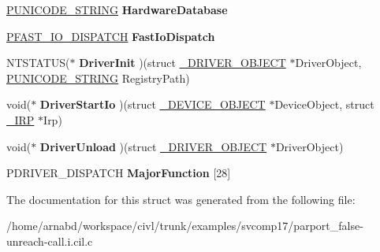 \begin{DoxyCompactItemize}
\item 
\hypertarget{struct__DRIVER__OBJECT_a112fcbcac6369066a448fd7622670535}{}\hyperlink{struct__UNICODE__STRING}{P\+U\+N\+I\+C\+O\+D\+E\+\_\+\+S\+T\+R\+I\+N\+G} {\bfseries Hardware\+Database}\label{struct__DRIVER__OBJECT_a112fcbcac6369066a448fd7622670535}

\item 
\hypertarget{struct__DRIVER__OBJECT_a76534a5c0961700f050b64f0f7a2d7a6}{}\hyperlink{struct__FAST__IO__DISPATCH}{P\+F\+A\+S\+T\+\_\+\+I\+O\+\_\+\+D\+I\+S\+P\+A\+T\+C\+H} {\bfseries Fast\+Io\+Dispatch}\label{struct__DRIVER__OBJECT_a76534a5c0961700f050b64f0f7a2d7a6}

\item 
\hypertarget{struct__DRIVER__OBJECT_a5d751b75e5bd2962d646635801953b55}{}N\+T\+S\+T\+A\+T\+U\+S($\ast$ {\bfseries Driver\+Init} )(struct \hyperlink{struct__DRIVER__OBJECT}{\+\_\+\+D\+R\+I\+V\+E\+R\+\_\+\+O\+B\+J\+E\+C\+T} $\ast$Driver\+Object, \hyperlink{struct__UNICODE__STRING}{P\+U\+N\+I\+C\+O\+D\+E\+\_\+\+S\+T\+R\+I\+N\+G} Registry\+Path)\label{struct__DRIVER__OBJECT_a5d751b75e5bd2962d646635801953b55}

\item 
\hypertarget{struct__DRIVER__OBJECT_a3953c3b3473a74a85fe2d598cb4fe2b2}{}void($\ast$ {\bfseries Driver\+Start\+Io} )(struct \hyperlink{struct__DEVICE__OBJECT}{\+\_\+\+D\+E\+V\+I\+C\+E\+\_\+\+O\+B\+J\+E\+C\+T} $\ast$Device\+Object, struct \hyperlink{struct__IRP}{\+\_\+\+I\+R\+P} $\ast$Irp)\label{struct__DRIVER__OBJECT_a3953c3b3473a74a85fe2d598cb4fe2b2}

\item 
\hypertarget{struct__DRIVER__OBJECT_aded034bd7664cf454169cb801143b979}{}void($\ast$ {\bfseries Driver\+Unload} )(struct \hyperlink{struct__DRIVER__OBJECT}{\+\_\+\+D\+R\+I\+V\+E\+R\+\_\+\+O\+B\+J\+E\+C\+T} $\ast$Driver\+Object)\label{struct__DRIVER__OBJECT_aded034bd7664cf454169cb801143b979}

\item 
\hypertarget{struct__DRIVER__OBJECT_a95c3b04033b7896f36077a731598a2d9}{}P\+D\+R\+I\+V\+E\+R\+\_\+\+D\+I\+S\+P\+A\+T\+C\+H {\bfseries Major\+Function} \mbox{[}28\mbox{]}\label{struct__DRIVER__OBJECT_a95c3b04033b7896f36077a731598a2d9}

\end{DoxyCompactItemize}


The documentation for this struct was generated from the following file\+:\begin{DoxyCompactItemize}
\item 
/home/arnabd/workspace/civl/trunk/examples/svcomp17/parport\+\_\+false-\/unreach-\/call.\+i.\+cil.\+c\end{DoxyCompactItemize}
